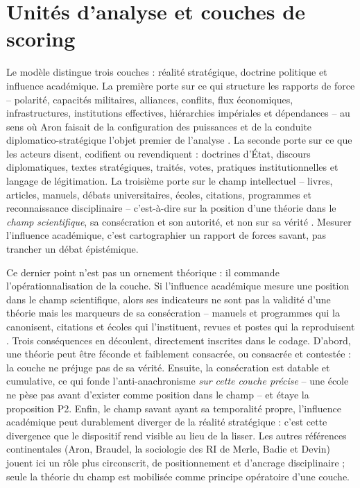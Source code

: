 \documentclass[11pt,a4paper]{article}
\begin{document}
\section{Unités d'analyse et couches de scoring}

Le modèle distingue trois couches : réalité stratégique, doctrine politique et influence académique. La première porte sur ce qui structure les rapports de force -- polarité, capacités militaires, alliances, conflits, flux économiques, infrastructures, institutions effectives, hiérarchies impériales et dépendances -- au sens où Aron faisait de la configuration des puissances et de la conduite diplomatico-stratégique l'objet premier de l'analyse \citep{aron1962paix}. La seconde porte sur ce que les acteurs disent, codifient ou revendiquent : doctrines d'État, discours diplomatiques, textes stratégiques, traités, votes, pratiques institutionnelles et langage de légitimation. La troisième porte sur le champ intellectuel -- livres, articles, manuels, débats universitaires, écoles, citations, programmes et reconnaissance disciplinaire -- c'est-à-dire sur la position d'une théorie dans le \emph{champ scientifique}, sa consécration et son autorité, et non sur sa vérité \citep{bourdieu1976champ}. Mesurer l'influence académique, c'est cartographier un rapport de forces savant, pas trancher un débat épistémique.

Ce dernier point n'est pas un ornement théorique : il commande l'opérationnalisation de la couche. Si l'influence académique mesure une position dans le champ scientifique, alors ses indicateurs ne sont pas la validité d'une théorie mais les marqueurs de sa consécration -- manuels et programmes qui la canonisent, citations et écoles qui l'instituent, revues et postes qui la reproduisent \citep{bourdieu1976champ}. Trois conséquences en découlent, directement inscrites dans le codage. D'abord, une théorie peut être féconde et faiblement consacrée, ou consacrée et contestée : la couche ne préjuge pas de sa vérité. Ensuite, la consécration est datable et cumulative, ce qui fonde l'anti-anachronisme \emph{sur cette couche précise} -- une école ne pèse pas avant d'exister comme position dans le champ -- et étaye la proposition P2. Enfin, le champ savant ayant sa temporalité propre, l'influence académique peut durablement diverger de la réalité stratégique : c'est cette divergence que le dispositif rend visible au lieu de la lisser. Les autres références continentales (Aron, Braudel, la sociologie des RI de Merle, Badie et Devin) jouent ici un rôle plus circonscrit, de positionnement et d'ancrage disciplinaire ; seule la théorie du champ est mobilisée comme principe opératoire d'une couche.
\end{document}
